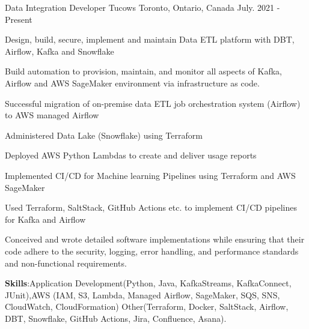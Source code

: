 

\begin{cventries}

  \cventry
    {Data Integration Developer} %
    {Tucows} %
    {Toronto, Ontario, Canada} %
    {July. 2021 - Present} %
    {
      \begin{cvitems} %
        \item {Design, build, secure, implement and maintain Data ETL platform with DBT, Airflow, Kafka and Snowflake}
        \item {Build automation to provision, maintain, and monitor all aspects of Kafka, Airflow and AWS SageMaker  environment via infrastructure as code.}
        \item {Successful  migration of on-premise data ETL job orchestration system (Airflow) to AWS managed Airflow}
        \item {Administered Data Lake (Snowflake) using Terraform}
        \item {Deployed AWS Python Lambdas to create and deliver usage reports }
        \item {Implemented CI/CD for Machine learning Pipelines using Terraform and AWS SageMaker}
        \item { Used Terraform, SaltStack, GitHub Actions etc. to implement CI/CD pipelines for Kafka and Airflow}
        \item {Conceived and wrote detailed software implementations while ensuring that their code adhere to the security, logging, error handling, and performance standards and non-functional requirements.}
        \vspace{1mm} %
        \item {\textbf{Skills}:Application Development(Python, Java, KafkaStreams, KafkaConnect, JUnit),AWS (IAM, S3, Lambda, Managed Airflow, SageMaker, SQS, SNS, CloudWatch, CloudFormation) Other(Terraform, Docker, SaltStack, Airflow, DBT, Snowflake, GitHub Actions, Jira, Confluence, Asana).}
      \end{cvitems}
    }
    \vspace{5mm} %

\end{cventries}
